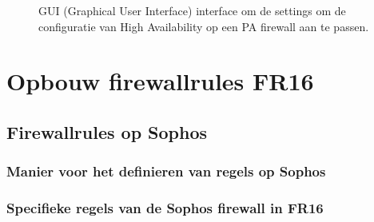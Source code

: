 \begin{figure}[H]
    \centering
    \caption[PA High Availability settings]{\label{fig:grail}GUI (Graphical User Interface) interface om de settings om de configuratie van High Availability op een PA firewall aan te passen.}
\end{figure}





\chapter{Opbouw firewallrules FR16}

\section{Firewallrules op Sophos}
\subsection{Manier voor het definieren van regels op Sophos}
\subsection{Specifieke regels van de Sophos firewall in FR16}

